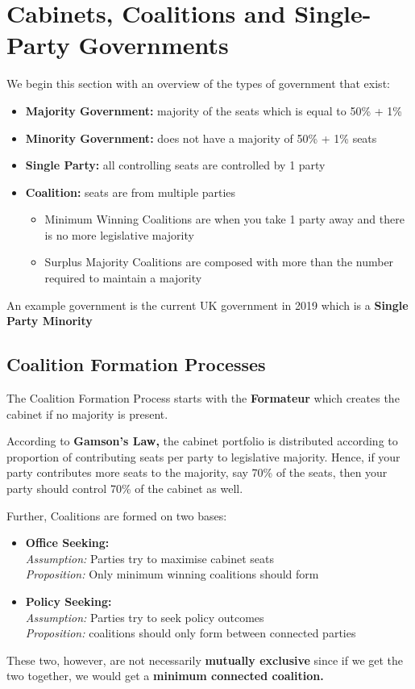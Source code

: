 \documentclass[12pt, letterpaper]{article}
\begin{document}
\newpage
\section{Cabinets, Coalitions and Single-Party Governments}
We begin this section with an overview of the types of government that exist:
\begin{itemize}
	\item \textbf{Majority Government:} majority of the seats which is equal to 50\% + 1\%
	\item \textbf{Minority Government:} does not have a majority of 50\% + 1\% seats
	\item \textbf{Single Party:} all controlling seats are controlled by 1 party
	\item \textbf{Coalition:} seats are from multiple parties
		\begin{itemize}
			\item Minimum Winning Coalitions are when you take 1 party away and there is no more legislative majority
			\item Surplus Majority Coalitions are composed with more than the number required to maintain a majority
		\end{itemize}
\end{itemize}
An example government is the current UK government in 2019 which is a \textbf{Single Party Minority}

\subsection{Coalition Formation Processes}
The Coalition Formation Process starts with the \textbf{Formateur} which creates the cabinet if no majority is present.

According to \textbf{Gamson's Law,} the cabinet portfolio is distributed according to proportion of contributing seats per party to legislative majority. Hence, if your party contributes more seats to the majority, say 70\% of the seats, then your party should control 70\% of the cabinet as well.

Further, Coalitions are formed on two bases:
\begin{itemize}
	\item \textbf{Office Seeking:}\\
		\textit{Assumption:} Parties try to maximise cabinet seats\\
		\textit{Proposition:} Only minimum winning coalitions should form
	\item \textbf{Policy Seeking:}\\
		\textit{Assumption:} Parties try to seek policy outcomes\\
		\textit{Proposition:} coalitions should only form between connected parties
\end{itemize}
These two, however, are not necessarily \textbf{mutually exclusive} since if we get the two together, we would get a \textbf{minimum connected coalition.}
\end{document}
